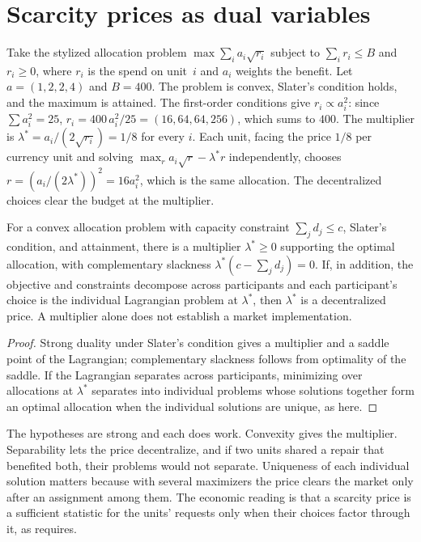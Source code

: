 \section{Scarcity prices as dual variables}

Take the stylized allocation problem $\max\sum_i a_i\sqrt{r_i}$ subject to $\sum_i r_i\le B$ and $r_i\ge 0$, where $r_i$ is the spend on unit~$i$ and $a_i$ weights the benefit. Let $a=(1,2,2,4)$ and $B=400$. The problem is convex, Slater's condition holds, and the maximum is attained. The first-order conditions give $r_i\propto a_i^2$: since $\sum a_i^2=25$, $r_i=400\,a_i^2/25=(16,64,64,256)$, which sums to $400$. The multiplier is $\lambda^*=a_i/(2\sqrt{r_i})=1/8$ for every $i$. Each unit, facing the price $1/8$ per currency unit and solving $\max_r a_i\sqrt r-\lambda^* r$ independently, chooses $r=(a_i/(2\lambda^*))^2=16a_i^2$, which is the same allocation. The decentralized choices clear the budget at the multiplier.

\begin{theorem}\label{thm:P24}
For a convex allocation problem with capacity constraint $\sum_jd_j\le c$, Slater's condition, and attainment, there is a multiplier $\lambda^*\ge 0$ supporting the optimal allocation, with complementary slackness $\lambda^*(c-\sum_jd_j)=0$. If, in addition, the objective and constraints decompose across participants and each participant's choice is the individual Lagrangian problem at $\lambda^*$, then $\lambda^*$ is a decentralized price. A multiplier alone does not establish a market implementation.
\end{theorem}

\begin{proof}
Strong duality under Slater's condition gives a multiplier and a saddle point of the Lagrangian; complementary slackness follows from optimality of the saddle. If the Lagrangian separates across participants, minimizing over allocations at $\lambda^*$ separates into individual problems whose solutions together form an optimal allocation when the individual solutions are unique, as here.
\end{proof}

The hypotheses are strong and each does work. Convexity gives the multiplier. Separability lets the price decentralize, and if two units shared a repair that benefited both, their problems would not separate. Uniqueness of each individual solution matters because with several maximizers the price clears the market only after an assignment among them. The economic reading is that a scarcity price is a sufficient statistic for the units' requests only when their choices factor through it, as  requires.

